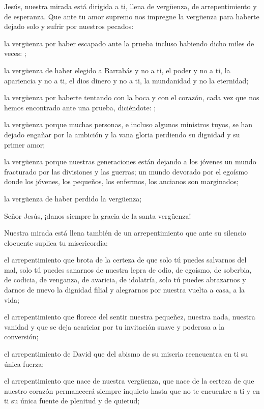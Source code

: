 \begin{body}
 Jesús, nuestra mirada está dirigida a ti, llena de vergüenza, de arrepentimiento y de esperanza. Que ante tu amor supremo nos impregne la vergüenza para haberte dejado solo y sufrir por nuestros pecados: 

la vergüenza por haber escapado ante la prueba incluso habiendo dicho miles de veces: ; 

la vergüenza de haber elegido a Barrabás y no a ti, el poder y no a ti, la apariencia y no a ti, el dios dinero y no a ti, la mundanidad y no la eternidad; 

la vergüenza por haberte tentando con la boca y con el corazón, cada vez que nos hemos encontrado ante una prueba, diciéndote: ;

la vergüenza porque muchas personas, e incluso algunos ministros tuyos, se han dejado engañar por la ambición y la vana gloria perdiendo su dignidad y su primer amor; 

la vergüenza porque nuestras generaciones están dejando a los jóvenes un mundo fracturado por las divisiones y las guerras; un mundo devorado por el egoísmo donde los jóvenes, los pequeños, los enfermos, los ancianos son marginados; 

la vergüenza de haber perdido la vergüenza;

Señor Jesús, ¡danos siempre la gracia de la santa vergüenza!

Nuestra mirada está llena también de un arrepentimiento que ante su silencio elocuente suplica tu misericordia:

el arrepentimiento que brota de la certeza de que solo tú puedes salvarnos del mal, solo tú puedes sanarnos de nuestra lepra de odio, de egoísmo, de soberbia, de codicia, de venganza, de avaricia, de idolatría, solo tú puedes abrazarnos y darnos de nuevo la dignidad filial y alegrarnos por nuestra vuelta a casa, a la vida; 

el arrepentimiento que florece del sentir nuestra pequeñez, nuestra nada, nuestra vanidad y que se deja acariciar por tu invitación suave y poderosa a la conversión; 

el arrepentimiento de David que del abismo de su miseria reencuentra en ti su única fuerza; 

el arrepentimiento que nace de nuestra vergüenza, que nace de la certeza de que nuestro corazón permanecerá siempre inquieto hasta que no te encuentre a ti y en ti su única fuente de plenitud y de quietud; 


\end{body}
